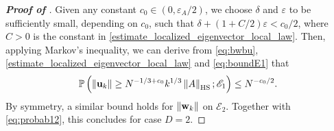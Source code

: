 \documentclass[10pt,reqno]{amsart}
\numberwithin{equation}{section}
\numberwithin{figure}{section}
\theoremstyle{plain} %
\theoremstyle{definition} %
\renewcommand{\txt}[1]{\text{\rm{#1}}}
\renewcommand{\P}{\mathbb{P}}
\renewcommand{\leq}{\le}
\renewcommand{\geq}{\ge}
\newcommand{\pa}[1]{\left({#1}\right)}
\newcommand{\norm}[1]{\lVert #1 \rVert}
\newcommand{\norma}[1]{\left\lVert #1 \right\rVert}
\newcommand{\bu}{{\bf{u}}}
\newcommand{\bw}{{\bf{w}}}
\newcommand{\e}{{\varepsilon}}
\newcommand{\HS}{\txt{HS}}
\numberwithin{equation}{section}
\begin{document}
\begin{proof}[\bf Proof of ]
Given any constant $c_0\in\pa{0,\varepsilon_A/2}$, we choose $\delta$ and $\varepsilon$ to be sufficiently small, depending on $c_0$, such that $\delta+(1+C/2)\e< c_0/2$, where $C>0$ is the constant in \eqref{estimate_localized_eigenvector_local_law}. Then, applying Markov's inequality, we can derive from \eqref{eq:bwbu}, \eqref{estimate_localized_eigenvector_local_law} and \eqref{eq:boundE1} that
\begin{equation}\label{eq:E1}
    \begin{aligned}
        \P\pa{\norm{\bu_k}\geq N^{-1/3+c_0}k^{1/3}\norma{A}_{\HS};\mathscr E_1} \leq N^{-c_0/2}.
    \end{aligned}
\end{equation}
By symmetry, a similar bound holds for $\norm{\bw_k}$ on $\mathscr{E}_2$. Together with \eqref{eq:probab12}, this concludes  for case $D= 2$.


\end{proof}
\end{document}
